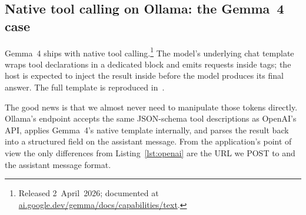 \subsection{Native tool calling on Ollama: the Gemma~4 case}
\label{sec:impl-gemma}

Gemma~4 ships with native tool calling.\footnote{Released
2~April~2026; documented at
\href{https://ai.google.dev/gemma/docs/capabilities/text/function-calling-gemma4}{ai.google.dev/gemma/docs/capabilities/text}.}
The model's underlying chat template wraps tool declarations in a
dedicated  block and emits requests
inside  tags;
the host is expected to inject the result inside
 before the model
produces its final answer. The full template is reproduced
in~\citet{gemma4card}.

The good news is that we almost never need to manipulate those
tokens directly. Ollama's  endpoint accepts the
same JSON-schema tool descriptions as OpenAI's API, applies Gemma~4's
native template internally, and parses the result back into a
structured  field on the assistant message. From
the application's point of view the only differences from
Listing~\ref{lst:openai} are the URL we POST to and the assistant
message format.

